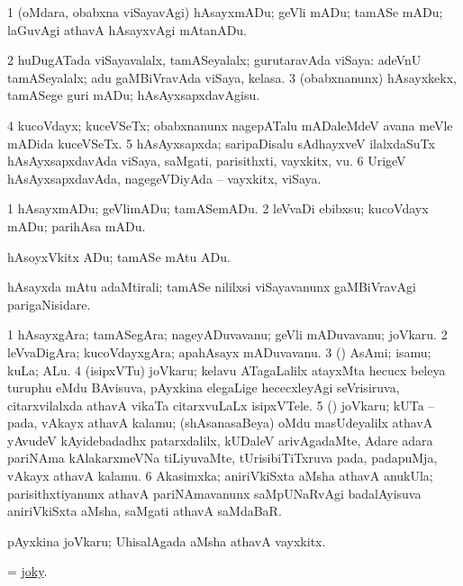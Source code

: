 \noindent
\gl{\pagu}
\bmng
\bnum
\num{1}  (oMdara, obabxna viSayavAgi) hAsayxmADu; geVli mADu; tamASe mADu; laGuvAgi athavA hAsayxvAgi mAtanADu. 
\num{2}  huDugATada viSayavalalx, tamASeyalalx; gurutaravAda viSaya:  adeVnU tamASeyalalx; adu gaMBiVravAda viSaya, kelasa. 
\num{3}  (obabxnanunx) hAsayxkekx, tamASege guri mADu; hAsAyxsapxdavAgisu. 
\num{4}  kucoVdayx; kuceVSeTx; obabxnanunx nagepATalu mADaleMdeV avana meVle mADida kuceVSeTx. 
\num{5}  hAsAyxsapxda; saripaDisalu sAdhayxveV ilalxdaSuTx hAsAyxsapxdavAda viSaya, saMgati, parisithxti, vayxkitx, \mo vu. 
\num{6}  UrigeV hAsAyxsapxdavAda, nagegeVDiyAda -- vayxkitx, viSaya. 
\enum
\emng
\eentry

\bentry
{}
\gl{\sakirx}
\bmng
\bnum
\num{1} hAsayxmADu; geVlimADu; tamASemADu. 
\num{2} leVvaDi ebibxsu; kucoVdayx mADu; parihAsa mADu. 
\enum
\emng

\noindent
\gl{\akirx}
\bmng
hAsoyxVkitx ADu; tamASe mAtu ADu. 
\emng

\noindent
\gl{\pagu}
\bmng
{} hAsayxda mAtu adaMtirali; tamASe nililxsi viSayavanunx gaMBiVravAgi parigaNisidare. 
\emng
\eentry

\bentry
{}
\gl{\nA}
\bmng
\bnum
\num{1} hAsayxgAra; tamASegAra; nageyADuvavanu; geVli mADuvavanu; joVkaru. 
\num{2} leVvaDigAra; kucoVdayxgAra; apahAsayx mADuvavanu. 
\num{3} (\ashi) AsAmi; isamu; kuLa; ALu. 
\num{4} (isipxVTu) joVkaru; kelavu ATagaLalilx atayxMta hecucx beleya turuphu eMdu BAvisuva, pAyxkina elegaLige hececxleyAgi seVrisiruva, citarxvilalxda athavA vikaTa citarxvuLaLx isipxVTele. 
\num{5} (\ame) joVkaru; kUTa -- pada, vAkayx athavA kalamu; (shAsanasaBeya) oMdu masUdeyalilx athavA yAvudeV kAyidebadadhx patarxdalilx, kUDaleV arivAgadaMte, Adare adara pariNAma kAlakarxmeVNa tiLiyuvaMte, tUrisibiTiTxruva pada, padapuMja, vAkayx athavA kalamu. 
\num{6} Akasimxka; aniriVkiSxta aMsha athavA anukUla; parisithxtiyanunx athavA pariNAmavanunx saMpUNaRvAgi badalAyisuva aniriVkiSxta aMsha, saMgati athavA saMdaBaR. 
\enum
\emng

\noindent
\gl{\nuga}
\bmng
{} pAyxkina joVkaru; UhisalAgada aMsha athavA vayxkitx. 
\emng
\eentry

\bentry
{}
\gl{\gu}
\bmng
 = \hyperlink{joky}{joky}. 
\emng
\eentry


